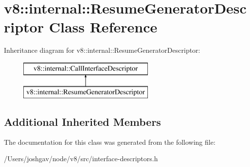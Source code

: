 \hypertarget{classv8_1_1internal_1_1_resume_generator_descriptor}{}\section{v8\+:\+:internal\+:\+:Resume\+Generator\+Descriptor Class Reference}
\label{classv8_1_1internal_1_1_resume_generator_descriptor}
Inheritance diagram for v8\+:\+:internal\+:\+:Resume\+Generator\+Descriptor\+:\begin{figure}[H]
\begin{center}
\leavevmode
\includegraphics[height=2.000000cm]{classv8_1_1internal_1_1_resume_generator_descriptor}
\end{center}
\end{figure}
\subsection*{Additional Inherited Members}


The documentation for this class was generated from the following file\+:\begin{DoxyCompactItemize}
\item 
/\+Users/joshgav/node/v8/src/interface-\/descriptors.\+h\end{DoxyCompactItemize}
